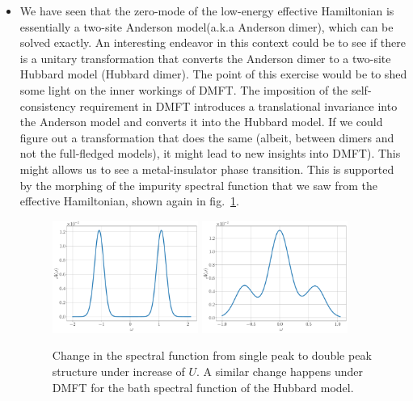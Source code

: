 \documentclass[twoside]{report}
\numberwithin{equation}{section}
\begin{document}
\begin{itemize}
	\item We have seen that the zero-mode of the low-energy effective Hamiltonian is essentially a two-site Anderson model(a.k.a Anderson dimer), which can be solved exactly. An interesting endeavor in this context could be to see if there is a unitary transformation that converts the Anderson dimer to a two-site Hubbard model (Hubbard dimer). The point of this exercise would be to shed some light on the inner workings of DMFT. The imposition of the self-consistency requirement in DMFT introduces a translational invariance into the Anderson model and converts it into the Hubbard model. If we could figure out a transformation that does the same (albeit, between dimers and not the full-fledged models), it might lead to new insights into DMFT). This might allows us to see a metal-insulator phase transition. This is supported by the morphing of the impurity spectral function that we saw from the effective Hamiltonian, shown again in fig.~\ref{spec_change}.
		\begin{figure}[htpb]
			\centering
			\includegraphics[width=0.45\textwidth]{../figures/ins3.pdf}
			\hspace{\fill}
			\includegraphics[width=0.45\textwidth]{../figures/metal3.pdf}
			\caption{Change in the spectral function from single peak to double peak structure under increase of \(U\). A similar change happens under DMFT for the bath spectral function of the Hubbard model.}
			\label{spec_change}
		\end{figure}

\end{itemize}
\end{document}
